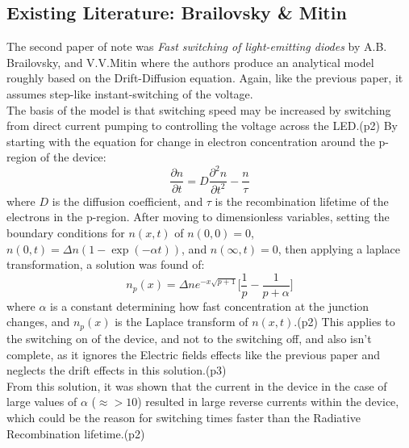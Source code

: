 \documentclass[titlepage]{article}
\begin{document}
\subsection{Existing Literature: Brailovsky \& Mitin}
The second paper of note was \textit{Fast switching of light-emitting diodes} by A.B. Brailovsky, and V.V.Mitin\cite{Brailovsky} where the authors produce an analytical model roughly based on the Drift-Diffusion equation. Again, like the previous paper, it assumes step-like instant-switching of the voltage.\\
The basis of the model is that switching speed may be increased by switching from direct current pumping to controlling the voltage  across the LED.\cite{Brailovsky}(p2) By starting with the equation for change in electron concentration around the p-region of the device:
\begin{equation}
\dfrac{\partial n}{\partial t} = D \dfrac{\partial^2n}{\partial t^2} - \frac{n}{\tau}
\end{equation}
where $D$ is the diffusion coefficient, and $\tau$ is the recombination lifetime of the electrons in the p-region. After moving to dimensionless variables, setting the boundary conditions for $n(x,t)$ of $n(0,0) = 0$, $n(0,t) = \Delta n(1-\exp(-\alpha t))$, and $n(\infty,t) = 0$, then applying a laplace transformation, a solution was found of:
\begin{equation}
n_p(x) = \Delta n e^{-x\sqrt{p+1}}\Big[\frac{1}{p}-\frac{1}{p+\alpha}\Big]
\end{equation}
where $\alpha$ is a constant determining how fast concentration at the junction changes, and $n_p(x)$ is the Laplace transform of $n(x,t)$.\cite{Brailovsky}(p2) This applies to the switching on of the device, and not to the switching off, and also isn't complete, as it ignores the Electric fields effects like the previous paper and neglects the drift effects in this solution.\cite{Brailovsky}(p3) \\
From this solution, it was shown that the current in the device in the case of large values of $\alpha$ ($\approx>10$) resulted in large reverse currents within the device, which could be the reason for switching times faster than the Radiative Recombination lifetime.\cite{Brailovsky}(p2)\\
\end{document}
